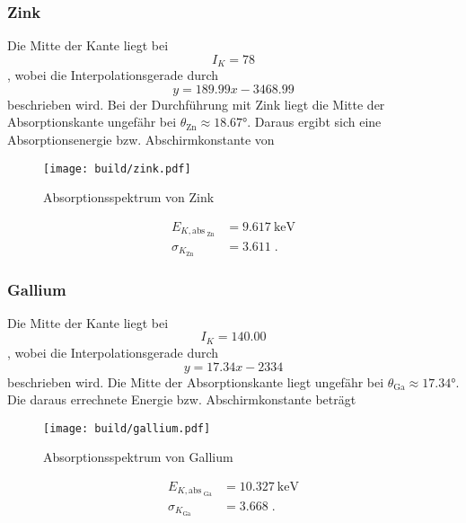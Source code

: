 \subsubsection{Zink}
Die Mitte der Kante liegt bei 
\begin{equation*}
    I_K = 78
\end{equation*}
, wobei die Interpolationsgerade durch 
\begin{equation*}
    y = 189.99 x - 3468.99
\end{equation*}
beschrieben wird.
Bei der Durchführung mit Zink liegt die Mitte der Absorptionskante ungefähr bei $\theta_\text{Zn} \approx \ang{18.67;;}$. Daraus ergibt sich eine Absorptionsenergie bzw. Abschirmkonstante von 
\begin{figure}
    \centering
    \caption{Absorptionsspektrum von Zink}
    \label{fig:zink}
    \texttt{[image: build/zink.pdf]}
\end{figure}
\begin{align*}
    E_{K, \text{abs}_\text{ Zn}}  &= \SI{9.617}{\kilo\electronvolt} \\
    \sigma_{K_\text{Zn}}         &= \num{3.611} \; \text{.}
\end{align*}
\FloatBarrier
\subsubsection{Gallium}
Die Mitte der Kante liegt bei 
\begin{equation*}
    I_K = 140.00
\end{equation*}
, wobei die Interpolationsgerade durch 
\begin{equation*}
    y = 17.34x -2334
\end{equation*}
beschrieben wird.
Die Mitte der Absorptionskante liegt ungefähr bei $\theta_\text{Ga} \approx \ang{17.34;;}$. Die daraus errechnete Energie bzw. Abschirmkonstante beträgt
\begin{figure}
    \centering
    \caption{Absorptionsspektrum von Gallium}
    \label{fig:Gallium}
    \texttt{[image: build/gallium.pdf]}
\end{figure}
\begin{align*}
    E_{K, \text{abs}_\text{ Ga}}  &= \SI{10.327}{\kilo\electronvolt} \\
    \sigma_{K_\text{Ga}}                &= \num{3.668} \; \text{.}
\end{align*}
\FloatBarrier
